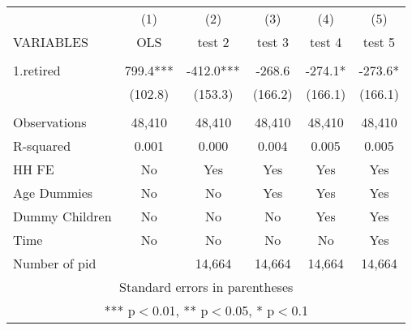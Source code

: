 \begin{tabular}{lccccc} \hline
 & (1) & (2) & (3) & (4) & (5) \\
VARIABLES & OLS & test 2 & test 3 & test 4 & test 5 \\ \hline
 &  &  &  &  &  \\
1.retired & 799.4*** & -412.0*** & -268.6 & -274.1* & -273.6* \\
 & (102.8) & (153.3) & (166.2) & (166.1) & (166.1) \\
 &  &  &  &  &  \\
Observations & 48,410 & 48,410 & 48,410 & 48,410 & 48,410 \\
R-squared & 0.001 & 0.000 & 0.004 & 0.005 & 0.005 \\
HH FE & No & Yes & Yes & Yes & Yes \\
Age Dummies & No & No & Yes & Yes & Yes \\
Dummy Children & No & No & No & Yes & Yes \\
Time & No & No & No & No & Yes \\
 Number of pid &  & 14,664 & 14,664 & 14,664 & 14,664 \\ \hline
\multicolumn{6}{c}{ Standard errors in parentheses} \\
\multicolumn{6}{c}{ *** p$<$0.01, ** p$<$0.05, * p$<$0.1} \\
\end{tabular}
